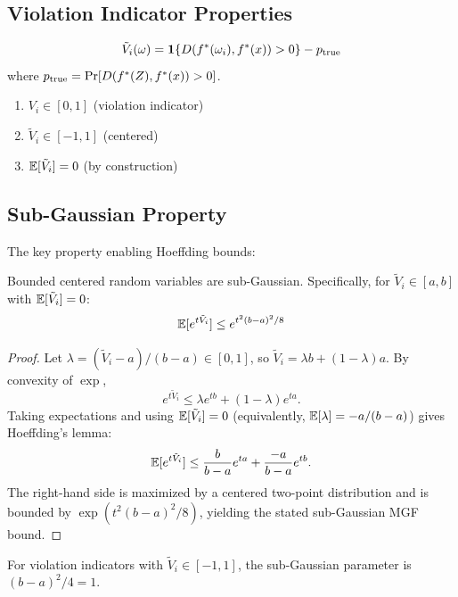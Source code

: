 \subsection{Violation Indicator Properties}

\begin{definition}
\[
\tilde{V}_i(\omega) = \mathbf{1}\{D(f^{\ast}(\omega_i), f^{\ast}(x)) > 0\} - p_{\text{true}}
\]
where $p_{\text{true}} = \Pr[D(f^{\ast}(Z), f^{\ast}(x)) > 0]$.
\end{definition}

\begin{lemma}
\begin{enumerate}
    \item $V_i \in [0, 1]$ (violation indicator)
    \item $\tilde{V}_i \in [-1, 1]$ (centered)
    \item $\mathbb{E}[\tilde{V}_i] = 0$ (by construction)
\end{enumerate}
\end{lemma}

\subsection{Sub-Gaussian Property}

The key property enabling Hoeffding bounds:

\begin{theorem}
Bounded centered random variables are sub-Gaussian. Specifically, for $\tilde{V}_i \in [a, b]$ with $\mathbb{E}[\tilde{V}_i] = 0$:
\[
\mathbb{E}[e^{t\tilde{V}_i}] \le e^{t^2(b-a)^2/8}
\]
\end{theorem}

\begin{proof}
Let $\lambda=(\tilde{V}_i-a)/(b-a)\in[0,1]$, so $\tilde{V}_i=\lambda b+(1-\lambda)a$. By convexity of $\exp$,
\[
e^{t\tilde{V}_i}\le \lambda e^{tb}+(1-\lambda)e^{ta}.
\]
Taking expectations and using $\mathbb{E}[\tilde{V}_i]=0$ (equivalently, $\mathbb{E}[\lambda]=-a/(b-a)$) gives Hoeffding's lemma:
\[
\mathbb{E}[e^{t\tilde{V}_i}] \le \frac{b}{b-a}e^{ta}+\frac{-a}{b-a}e^{tb}.
\]
The right-hand side is maximized by a centered two-point distribution and is bounded by
$\exp\!\left(t^2(b-a)^2/8\right)$, yielding the stated sub-Gaussian MGF bound.
\end{proof}

For violation indicators with $\tilde{V}_i \in [-1, 1]$, the sub-Gaussian parameter is $(b-a)^2/4 = 1$.

